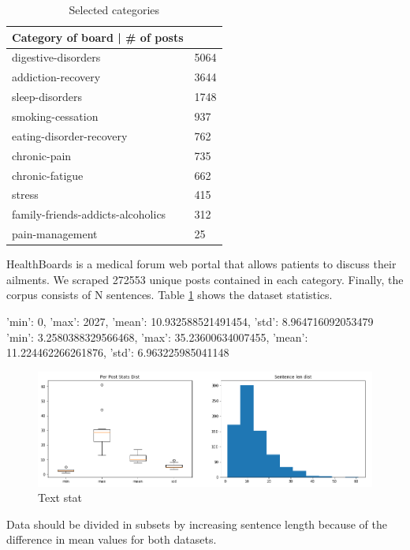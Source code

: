 \documentclass[11pt]{article}
\begin{document}
\begin{center}
\begin{table}
\begin{tabular}{ |p{7cm}|p{7cm}| }
\hline
Category of board |  # of posts \\ \hline
digestive-disorders & 5064 \\ \hline
addiction-recovery & 3644 \\ \hline
sleep-disorders & 1748 \\ \hline
smoking-cessation & 937 \\ \hline
eating-disorder-recovery & 762 \\ \hline
chronic-pain & 735 \\ \hline
chronic-fatigue & 662 \\ \hline
stress & 415 \\ \hline
family-friends-addicts-alcoholics & 312 \\ \hline
pain-management & 25 \\ \hline
\end{tabular}
\caption{\label{cat_freq}Selected categories}

\end{table}
\end{center}


HealthBoards is a medical forum web portal that allows patients to discuss their ailments.
We scraped 272553 unique posts contained in each category. Finally, the corpus consists of N  sentences. Table \ref{visina8} shows the dataset statistics.


{'min': 0, 'max': 2027, 'mean': 10.932588521491454, 'std': 8.964716092053479}
{'min': 3.2580388329566468, 'max': 35.23600634007455, 'mean': 11.224462266261876, 'std': 6.963225985041148}


 \begin{figure}[h]
 	\centering
 	\includegraphics[scale=0.5]{report3.png}
	\caption{Text stat}\label{visina8}
 \end{figure}

Data should be divided in subsets by increasing sentence length because of the difference in mean values for both datasets.
\end{document}
